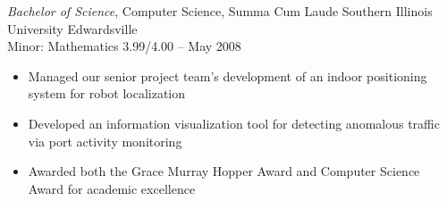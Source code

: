 \documentclass[margin,line]{resume}
\begin{document}
\begin{resume}
{\small
  {\sl Bachelor of Science}, Computer Science, Summa Cum Laude \hfill
  Southern Illinois University Edwardsville\\
  Minor: Mathematics \hfill
  3.99/4.00 -- May 2008
}
\begin{itemize} \itemsep -2pt %
\small\item Managed our senior project team's development of an indoor positioning system for robot localization
\small\item Developed an information visualization tool for detecting anomalous traffic via port activity monitoring
\small\item Awarded both the Grace Murray Hopper Award and Computer Science Award for academic excellence
\end{itemize}






\end{resume}
\end{document}
